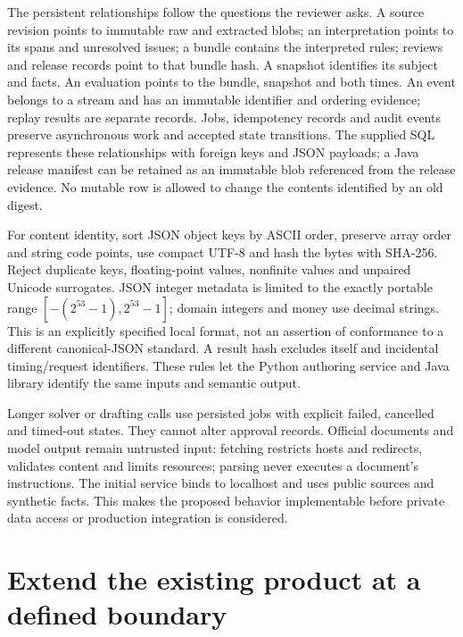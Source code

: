 The persistent relationships follow the questions the reviewer asks. A source
revision points to immutable raw and extracted blobs; an interpretation points
to its spans and unresolved issues; a bundle contains the interpreted rules;
reviews and release records point to that bundle hash. A snapshot identifies
its subject and facts. An evaluation points to the bundle, snapshot and both
times. An event belongs to a stream and has an immutable identifier and ordering
evidence; replay results are separate records. Jobs, idempotency records and audit
events preserve asynchronous work and accepted state transitions. The supplied
SQL represents these relationships with foreign keys and JSON payloads; a Java
release manifest can be retained as an immutable blob referenced from the
release evidence. No mutable row is allowed to change the contents identified
by an old digest.

For content identity, sort JSON object keys by ASCII order, preserve array order
and string code points, use compact UTF-8 and hash the bytes with SHA-256.
Reject duplicate keys, floating-point values, nonfinite values and unpaired
Unicode surrogates. JSON integer metadata is limited to the exactly portable
range $[-(2^{53}-1),2^{53}-1]$; domain integers and money use decimal strings.
This is an explicitly specified local format, not an assertion of conformance
to a different canonical-JSON standard. A result hash excludes itself and
incidental timing/request identifiers. These rules let the Python authoring
service and Java library identify the same inputs and semantic output.

Longer solver or drafting calls use persisted jobs with explicit failed,
cancelled and timed-out states. They cannot alter approval records. Official
documents and model output remain untrusted input: fetching restricts hosts and
redirects, validates content and limits resources; parsing never executes a
document's instructions. The initial service binds to localhost and uses public
sources and synthetic facts. This makes the proposed behavior implementable
before private data access or production integration is considered.



\section{Extend the existing product at a defined boundary}
\label{merge:M08:00}


